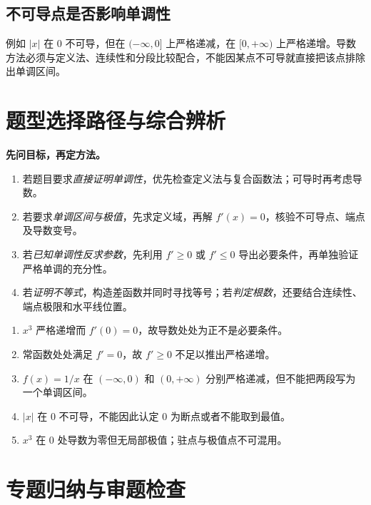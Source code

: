 
\subsection{不可导点是否影响单调性}
例如 $|x|$ 在 $0$ 不可导，但在 $(-\infty,0]$ 上严格递减，在 $[0,+\infty)$ 上严格递增。导数方法必须与定义法、连续性和分段比较配合，不能因某点不可导就直接把该点排除出单调区间。

\section{题型选择路径与综合辨析}

\begin{methodbox}
\textbf{先问目标，再定方法。}
\begin{enumerate}[label=(\arabic*)]
\item 若题目要求\emph{直接证明单调性}，优先检查定义法与复合函数法；可导时再考虑导数。
\item 若要求\emph{单调区间与极值}，先求定义域，再解 $f'(x)=0$，核验不可导点、端点及导数变号。
\item 若\emph{已知单调性反求参数}，先利用 $f'\ge0$ 或 $f'\le0$ 导出必要条件，再单独验证严格单调的充分性。
\item 若\emph{证明不等式}，构造差函数并同时寻找等号；若\emph{判定根数}，还要结合连续性、端点极限和水平线位置。
\end{enumerate}
\end{methodbox}

\begin{knowledgebox}[title=五个必须辨别的反例]
\begin{enumerate}[label=(\arabic*)]
\item $x^3$ 严格递增而 $f'(0)=0$，故导数处处为正不是必要条件。
\item 常函数处处满足 $f'=0$，故 $f'\ge0$ 不足以推出严格递增。
\item $f(x)=1/x$ 在 $(-\infty,0)$ 和 $(0,+\infty)$ 分别严格递减，但不能把两段写为一个单调区间。
\item $|x|$ 在 $0$ 不可导，不能因此认定 $0$ 为断点或者不能取到最值。
\item $x^3$ 在 $0$ 处导数为零但无局部极值；驻点与极值点不可混用。
\end{enumerate}
\end{knowledgebox}

\section{专题归纳与审题检查}

